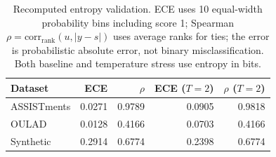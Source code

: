 \begin{table}[t]
\centering
\small
\caption{Recomputed entropy validation. ECE uses 10 equal-width probability bins including score 1; Spearman $\rho=\mathrm{corr}_{\mathrm{rank}}(u,|y-s|)$ uses average ranks for ties; the error is probabilistic absolute error, not binary misclassification. Both baseline and temperature stress use entropy in bits.}
\label{tab:uncertainty_proxy_validation}
\begin{tabular}{lrrrr}
\toprule
Dataset & ECE & $\rho$ & ECE ($T=2$) & $\rho$ ($T=2$) \\
\midrule
ASSISTments & 0.0271 & 0.9789 & 0.0905 & 0.9818 \\
OULAD & 0.0128 & 0.4166 & 0.0703 & 0.4166 \\
Synthetic & 0.2914 & 0.6774 & 0.2398 & 0.6774 \\
\bottomrule
\end{tabular}
\end{table}
